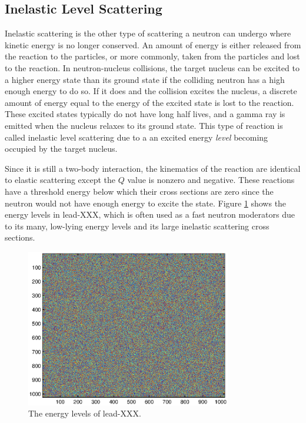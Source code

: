\subsection{Inelastic Level Scattering}

Inelastic scattering is the other type of scattering a neutron can undergo where kinetic energy is no longer conserved.  An amount of energy is either released from the reaction to the particles, or more commonly, taken from the particles and lost to the reaction.  In neutron-nucleus collisions, the target nucleus can be excited to a higher energy state than its ground state if the colliding neutron has a high enough energy to do so.  If it does and the collision excites the nucleus, a discrete amount of energy equal to the energy of the excited state is lost to the reaction.  These excited states typically do not have long half lives, and a gamma ray is emitted when the nucleus relaxes to its ground state.  This type of reaction is called inelastic level scattering due to a an excited energy \emph{level} becoming occupied by the target nucleus.  

Since it is still a two-body interaction, the kinematics of the reaction are identical to elastic scattering except the $Q$ value is nonzero and negative.  These reactions have a threshold energy below which their cross sections are zero since the neutron would not have enough energy to excite the state.   Figure \ref{Elevels} shows the energy levels in lead-XXX, which is often used as a fast neutron moderators due to its many, low-lying energy levels and its large inelastic scattering cross sections.

\begin{figure}[h!]
  \centering
    \includegraphics[width=0.8\textwidth]{graphics/noise.eps}
     \caption{The energy levels of lead-XXX\cite{}. \label{Elevels}}
\end{figure}


